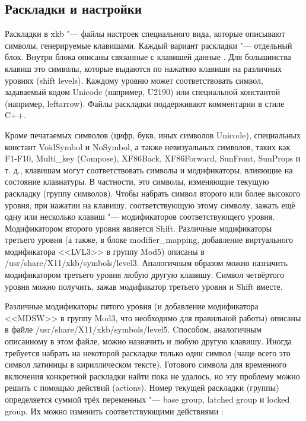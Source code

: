 \documentclass[10pt, a5paper]{article}
\begin{document}
\subsection*{Раскладки и настройки}

Раскладки в xkb "--- файлы настроек специального вида, которые описывают символы, генерируемые клавишами. Каждый вариант раскладки "--- отдельный блок. Внутри блока описаны связанные с клавишей данные \footnotemark[1]. Для большинства клавиш это символы, которые выдаются по нажатию клавиши на различных уровнях (shift levels). 
Каждому уровню может соответствовать символ, задаваемый кодом Unicode (например, U2190) или специальной константой (например, leftarrow). Файлы раскладки поддерживают комментарии в стиле C++.

Кроме печатаемых символов (цифр, букв, иных символов \linebreak Unicode), специальных констант VoidSymbol и NoSymbol, а также невизуальных символов, таких как F1-F10, Multi\_key \linebreak (Compose), XF86Back, XF86Forward, SunFront, SunProps и т. д., клавишам могут соответствовать символы и модификаторы, влияющие на состояние клавиатуры. В частности, это символы, изменяющие текущую раскладку (группу символов). 
Чтобы набрать символ второго или более высокого уровня, при нажатии на клавишу, соответствующую этому символу, зажать ещё одну или несколько клавиш "--- модификаторов  соответствующего уровня. Модификатором второго уровня является Shift. Различные модификаторы третьего уровня (а также, в блоке modifier\_mapping, добавление виртуального модификатора <<LVL3>> в группу Mod5) описаны в /usr/share/X11/xkb/symbols/level3. Аналогичным образом можно назначить модификатором третьего уровня любую другую клавишу. Символ четвёртого уровня можно получить, зажав модификатор третьего уровня и Shift вместе.

Различные модификаторы пятого уровня (и добавление модификатора <<MDSW>> в группу Mod3, что необходимо для правильной работы) описаны в файле /usr/share/X11/xkb/symbols/level5. Cпособом, аналогичным описанному в этом файле, можно назначить и любую другую клавишу.
Иногда требуется набрать на некоторой раскладке только один символ (чаще всего это символ латиницы в кириллическом тексте). Готового символа для временного включения конкретной раскладки найти пока не удалось, но эту проблему можно решить с помощью действий (actions). Номер текущей раскладки (группы) определяется суммой трёх переменных "--- base group, latched group и locked group. Их можно изменить соответствующими действиями \footnotemark[1]:
\end{document}
